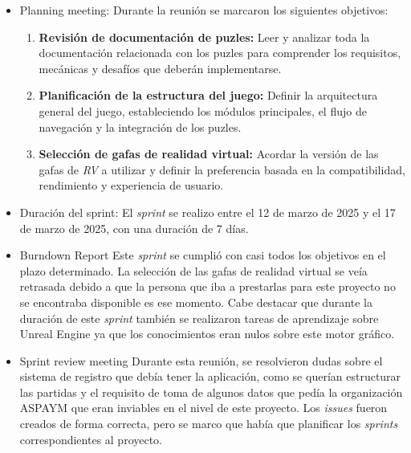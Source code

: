 \begin{itemize}
\item {Planning meeting}:
Durante la reunión se marcaron los siguientes objetivos:

\begin{enumerate}
\item \textbf{Revisión de documentación de puzles:}
  Leer y analizar toda la documentación relacionada con los puzles para comprender los requisitos,  
  mecánicas y desafíos que deberán implementarse.

\item \textbf{Planificación de la estructura del juego:}
  Definir la arquitectura general del juego, estableciendo los módulos  
  principales, el flujo de navegación y la integración de los puzles.

\item \textbf{Selección de gafas de realidad virtual:}
  Acordar la versión de las gafas de \textit{RV} a utilizar y definir la  
  preferencia basada en la compatibilidad, rendimiento y experiencia de usuario.
\end{enumerate}

    \item {Duración del sprint:}
El \textit{sprint } se realizo entre el 12 de marzo de 2025 y el 17 de marzo de 2025, con una duración de 7 días.

    \item {Burndown Report}
Este \textit{sprint} se cumplió con casi todos los objetivos en el plazo determinado. La selección de las gafas de realidad virtual se veía retrasada debido a que la persona que iba a prestarlas para este proyecto no se encontraba disponible es ese momento. Cabe destacar que durante la duración de este \textit{sprint} también se realizaron tareas de aprendizaje sobre Unreal Engine ya que los conocimientos eran nulos sobre este motor gráfico. 

    \item {Sprint review meeting}
Durante esta reunión, se resolvieron  dudas sobre el sistema de registro que debía tener la aplicación, como se querían estructurar las partidas y el requisito de toma de algunos datos que pedía la organización ASPAYM que eran inviables en el nivel de este proyecto. Los \textit{issues} fueron creados de forma correcta, pero se marco que había que planificar los \textit{sprints} correspondientes al proyecto.
\end{itemize}
